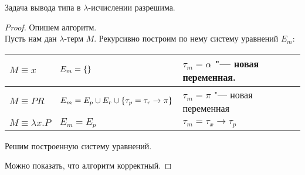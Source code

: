 \begin{theorem}
    Задача вывода типа в $\lambda$-исчислении разрешима.
\end{theorem}

\begin{proof}
    Опишем алгоритм. \\
    Пусть нам дан $\lambda$-терм $M$. Рекурсивно построим по нему систему уравнений $E_m$:
    \begin{center}
    \begin{tabular}{l l l} \toprule
        $M \equiv x$ & $E_m=\left\{\right\}$ & $\tau_m=\alpha$ "--- новая переменная. \\ \midrule
        $M \equiv PR$ & $E_m=E_p \cup E_r \cup \left\{\tau_p=\tau_r\rightarrow\pi\right\}$ & $\tau_m=\pi$ "--- новая переменная \\ \midrule
        $M \equiv \lambda x . P$ & $E_m=E_p$ & $\tau_m=\tau_x\rightarrow\tau_p$ \\ \bottomrule
    \end{tabular}
    \end{center}
    Решим построенную систему уравнений.

    Можно показать, что алгоритм корректный.
\end{proof}

\begin{example}
    \todo %
\end{example}

%
